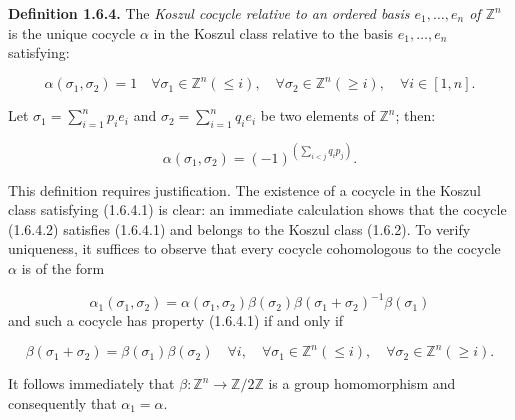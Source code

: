 %
\noindent\textbf{Definition 1.6.4.}\quad
The \emph{Koszul cocycle relative to an ordered basis
$e_1,\ldots,e_n$ of $\mathbb Z^n$} is the unique cocycle $\alpha$ in
the Koszul class relative to the basis $e_1,\ldots,e_n$ satisfying:

\begin{equation}
  \alpha(\sigma_1,\sigma_2)=1
  \quad
  \forall\sigma_1\in\mathbb Z^n(\leq i),\quad
  \forall\sigma_2\in\mathbb Z^n(\geq i),\quad
  \forall i\in[1,n].
  \tag{1.6.4.1}
\end{equation}

Let
$\sigma_1=\sum_{i=1}^{n}p_i e_i$ and
$\sigma_2=\sum_{i=1}^{n}q_i e_i$
be two elements of $\mathbb Z^n$; then:

\begin{equation}
  \alpha(\sigma_1,\sigma_2)
  =(-1)^{\left(\sum_{i<j}q_i p_j\right)}.
  \tag{1.6.4.2}
\end{equation}

This definition requires justification. The existence of a cocycle in
the Koszul class satisfying (1.6.4.1) is clear: an immediate calculation
shows that the cocycle (1.6.4.2) satisfies (1.6.4.1) and belongs to the
Koszul class (1.6.2). To verify uniqueness, it suffices to observe that
every cocycle cohomologous to the cocycle $\alpha$ is of the form

\begin{equation*}
  \alpha_1(\sigma_1,\sigma_2)
  =\alpha(\sigma_1,\sigma_2)
   \beta(\sigma_2)\beta(\sigma_1+\sigma_2)^{-1}\beta(\sigma_1)
\end{equation*}
and such a cocycle has property (1.6.4.1) if and only if

\begin{equation*}
  \beta(\sigma_1+\sigma_2)=\beta(\sigma_1)\beta(\sigma_2)
  \quad
  \forall i,\quad
  \forall\sigma_1\in\mathbb Z^n(\leq i),\quad
  \forall\sigma_2\in\mathbb Z^n(\geq i).
\end{equation*}

It follows immediately that
$\beta\colon\mathbb Z^n\longrightarrow\mathbb Z/2\mathbb Z$
is a group homomorphism and consequently that
$\alpha_1=\alpha$.

